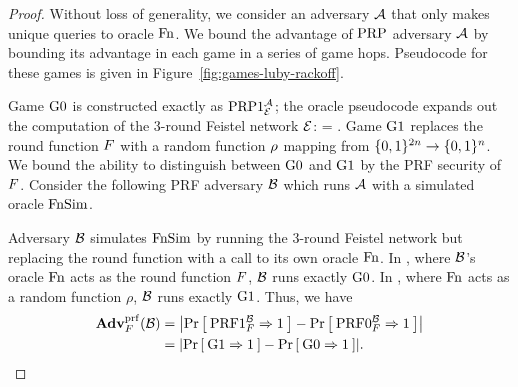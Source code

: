 \begin{proof}
Without loss of generality, we consider an adversary ${\mathcal A}$ that only makes unique queries to oracle $\textnormal{Fn}$.
 
We bound the advantage of $\textnormal{PRP}$ adversary ${\mathcal A}$ by bounding its advantage in each game in a series of game hops.
Pseudocode for these games is given in Figure~\ref{fig:games-luby-rackoff}.

Game ${{\textnormal G}}0$ is constructed exactly as $\textnormal{PRP}1^{{\mathcal A}}_{{\cal E}}$; the oracle pseudocode expands out the computation of the 3-round Feistel network ${\cal E}$:
\bnm
{} = .
\enm
Game ${{\textnormal G}}1$ replaces the round function $F$ with a random function $\rho$ mapping from $\{0,1\}^{2n}\rightarrow\{0,1\}^n$.
We bound the ability to distinguish between ${{\textnormal G}}0$ and ${{\textnormal G}}1$ by the PRF security of $F$.
Consider the following PRF adversary ${\mathcal B}$ which runs ${\mathcal A}$ with a simulated oracle $\textnormal{FnSim}$.

\begin{center}
\end{center}
 
Adversary ${\mathcal B}$ simulates $\textnormal{FnSim}$ by running the 3-round Feistel network but replacing the round function with a call to its own oracle $\textnormal{Fn}$.
In , where ${\mathcal B}$'s oracle $\textnormal{Fn}$ acts as the round function $F$, ${\mathcal B}$ runs exactly ${{\textnormal G}}0$.
In , where $\textnormal{Fn}$ acts as a random function $\rho$, ${\mathcal B}$ runs exactly ${{\textnormal G}}1$.
Thus, we have
\begin{align*}
\AdvPRF{\prf}{\advB} &= \absv*{\Prob{\PRF1_\prf^\advB\Rightarrow 1} - \Prob{\PRF0_\prf^\advB\Rightarrow1}}\\
&= \absv*{\Prob{\G1\Rightarrow 1} - \Prob{\G0\Rightarrow1}}.\\
\end{align*}


\end{proof}

